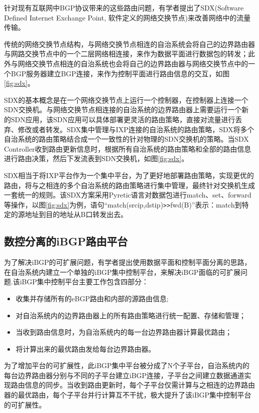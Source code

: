 针对现有互联网中BGP协议带来的这些路由问题，有学者提出了SDX\cite{sdx2015sigcomm}(Software Defined Internet Exchange Point, 软件定义的网络交换节点)来改善网络中的流量传输。


传统的网络交换节点结构，与网络交换节点相连的自治系统会将自己的边界路由器与网路交换节点中的一个二层网络相连接，来作为数据平面进行数据包的转发；此外与网络交换节点相连的自治系统也会将自己的边界路由器与网络交换节点中的一个BGP服务器建立BGP连接，来作为控制平面进行路由信息的交互，如图\ref{fig:sdx}。


SDX的基本概念是在一个网络交换节点上运行一个控制器，在控制器上连接一个SDN交换机。与网络交换节点相连接的自治系统的边界路由器上需要运行一个新的SDN应用，该SDN应用可以具体部署更灵活的路由策略，直接对流量进行丢弃、修改或者转发。SDX集中管理与IXP连接的自治系统的路由策略，SDX将多个自治系统的路由策略结合成一个一致性的针对物理的SDN交换机的策略。当SDX Controller收到路由更新信息时，根据所有自治系统的路由策略和全部的路由信息进行路由决策，然后下发流表到SDN交换机，如图\ref{fig:sdx}。


SDX相当于将IXP平台作为一个集中平台，为了更好地部署路由策略，实现更优的路由，将与之相连的多个自治系统的路由策略进行集中管理，最终针对交换机生成一套统一的规则。该SDX方案采用Pyretic\cite{monsanto2013}语言对数据包进行match、set、forward等操作，以图\ref{fig:sdx}为例，语句“match(srcip,dstip)\verb+>>+fwd(B)”表示：match到特定的源地址到目的地址从B口转发出去。

\subsection{数控分离的iBGP路由平台}
为了解决iBGP的可扩展问题，有学者提出使用数据平面和控制平面分离的思路，在自治系统内建立一个单独的iBGP集中控制平台\cite{Oprescu2011Rethinking}，来解决iBGP面临的可扩展问题.该iBGP集中控制平台主要工作包含四部分：
\begin{itemize}
  \item 收集并存储所有的eBGP路由和内部的源路由信息;
  \item 对自治系统内的边界路由器上的所有路由策略进行统一配置、存储和管理；
  \item 当收到路由信息时，为自治系统内的每一台边界路由器计算最优路由；
  \item 将计算出来的最优路由发给每台边界路由器。
\end{itemize}

为了增加平台的可扩展性，此iBGP集中平台被分成了N个子平台，自治系统内的每台边界路由器分别与不同的子平台建立iBGP连接，子平台之间建立数据通道实现路由信息的同步。当收到路由更新时，每个子平台仅需计算与之相连的边界路由器的最优路由，每个子平台并行计算互不干扰，极大提升了该iBGP集中控制平台的可扩展性。


